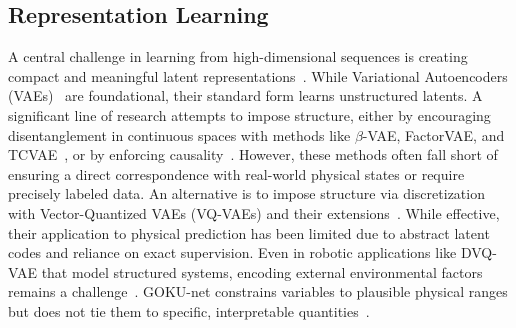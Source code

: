 \documentclass[nonacm,sigconf]{acmart}
\begin{document}
\subsection{Representation Learning}



 
A central challenge in learning from high-dimensional sequences is creating compact and meaningful latent representations~\cite[]{shi2015convolutional,bai2018empirical}. While Variational Autoencoders (VAEs)~\cite[]{kingma2013auto} are foundational, their standard form learns unstructured latents. A significant line of research attempts to impose structure, either by encouraging disentanglement in continuous spaces with methods like \(\beta\)-VAE, FactorVAE, and TCVAE~\cite[]{higgins2017beta, kim2018disentangling, chen2018isolating}, or by enforcing causality~\cite[]{yang2021causalvae}. However, these methods often fall short of ensuring a direct correspondence with real-world physical states or require precisely labeled data. An alternative is to impose structure via discretization with Vector-Quantized VAEs (VQ-VAEs) and their extensions~\cite[]{van2017neural, razavi2019generating, xue2019supervised}. While effective, their application to physical prediction has been limited due to abstract latent codes and reliance on exact supervision. Even in robotic applications like DVQ-VAE that model structured systems, encoding external environmental factors remains a challenge~\cite[]{zhao2024decomposed}. GOKU-net constrains variables to plausible physical ranges but does not tie them to specific, interpretable quantities~\cite[]{linial_generative_2021}.
\end{document}
